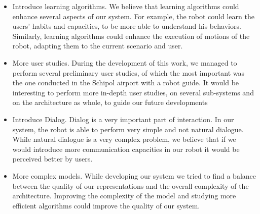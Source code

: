 \begin{itemize}
\item Introduce learning algorithms. We believe that learning algorithms could enhance several aspects of our system. For example, the robot could learn the users' habits and capacities, to be more able to understand his behaviors. Similarly, learning algorithms could enhance the execution of motions of the robot, adapting them to the current scenario and user.
\item More user studies. During the development of this work, we managed to perform several preliminary user studies, of which the most important was the one conducted in the Schipol airport with a robot guide. It would be interesting to perform more in-depth user studies, on several sub-systems and on the architecture as whole, to guide our future developments 
\item Introduce Dialog. Dialog is a very important part of interaction. In our system, the robot is able to perform very simple and not natural dialogue. While natural dialogue is a very complex problem, we believe that if we would introduce more communication capacities in our robot it would be perceived better by users.
\item More complex models. While developing our system we tried to find a balance between the quality of our representations and the overall complexity  of the architecture. Improving the complexity of the model and studying more efficient algorithms could improve the quality of our system.
\end{itemize}
